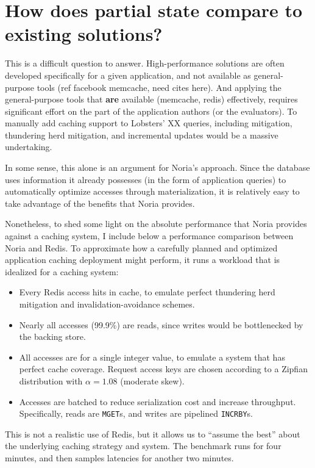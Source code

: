 \section{How does partial state compare to existing solutions?}
\label{s:eval:existing}

This is a difficult question to answer. High-performance solutions are
often developed specifically for a given application, and not available
as general-purpose tools (ref facebook memcache, need cites here).
And applying the general-purpose tools that \textbf{are} available (memcache,
redis) effectively, requires significant effort on the part of the
application authors (or the evaluators). To manually add caching support
to Lobsters' XX queries, including mitigation, thundering herd
mitigation, and incremental updates would be a massive undertaking.

In some sense, this alone is an argument for Noria's approach. Since the
database uses information it already possesses (in the form of
application queries) to automatically optimize accesses through
materialization, it is relatively easy to take advantage of the benefits
that Noria provides.

Nonetheless, to shed some light on the absolute performance that Noria
provides against a caching system, I include below a performance
comparison between Noria and Redis. To approximate how a carefully
planned and optimized application caching deployment might perform, it
runs a workload that is idealized for a caching system:

\begin{itemize}
 \item Every Redis access hits in cache, to emulate perfect thundering herd
   mitigation and invalidation-avoidance schemes.
 \item Nearly all accesses (99.9\%) are reads, since writes would be
   bottlenecked by the backing store.
 \item All accesses are for a single integer value, to emulate a system that has
   perfect cache coverage. Request access keys are chosen according to a Zipfian
    distribution with $\alpha = 1.08$ (moderate skew).
 \item Accesses are batched to reduce serialization cost and increase
   throughput. Specifically, reads are \texttt{MGET}s, and writes are pipelined
    \texttt{INCRBY}s.
\end{itemize}

This is not a realistic use of Redis, but it allows us to ``assume the best''
about the underlying caching strategy and system. The benchmark runs for four
minutes, and then samples latencies for another two minutes.

